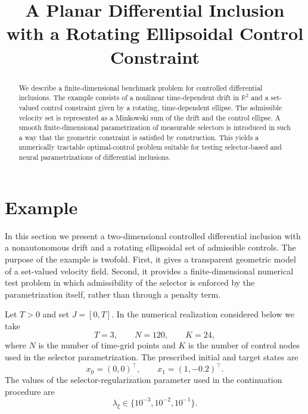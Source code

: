 \documentclass[11pt]{article}
\title{A Planar Differential Inclusion with a Rotating Ellipsoidal Control Constraint}
\author{}
\date{}
\theoremstyle{definition}
\theoremstyle{remark}
\newcommand{\R}{\mathbb{R}}
\begin{document}
\maketitle

\begin{abstract}
We describe a finite-dimensional benchmark problem for controlled differential inclusions. The example consists of a nonlinear time-dependent drift in $\R^2$ and a set-valued control constraint given by a rotating, time-dependent ellipse. The admissible velocity set is represented as a Minkowski sum of the drift and the control ellipse. A smooth finite-dimensional parametrization of measurable selectors is introduced in such a way that the geometric constraint is satisfied by construction. This yields a numerically tractable optimal-control problem suitable for testing selector-based and neural parametrizations of differential inclusions.
\end{abstract}

\section{Example}
\label{sec:example-rotating-ellipse}

In this section we present a two-dimensional controlled differential inclusion with a nonautonomous drift and a rotating ellipsoidal set of admissible controls. The purpose of the example is twofold. First, it gives a transparent geometric model of a set-valued velocity field. Second, it provides a finite-dimensional numerical test problem in which admissibility of the selector is enforced by the parametrization itself, rather than through a penalty term.

Let $T>0$ and set $J=[0,T]$. In the numerical realization considered below we take
\begin{equation}
    T=3, \qquad N=120, \qquad K=24,
\end{equation}
where $N$ is the number of time-grid points and $K$ is the number of control nodes used in the selector parametrization. The prescribed initial and target states are
\begin{equation}
    x_0=(0,0)^{\top}, \qquad x_1=(1,-0.2)^{\top}.
\end{equation}
The values of the selector-regularization parameter used in the continuation procedure are
\begin{equation}
    \lambda_{\xi}\in\{10^{-3},10^{-2},10^{-1}\}.
\end{equation}
\end{document}
